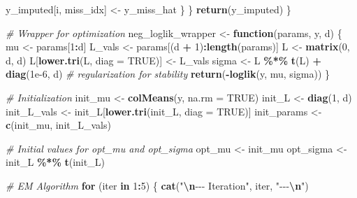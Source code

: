 \documentclass[
]{article}
\newenvironment{Shaded}{\begin{snugshade}}{\end{snugshade}}
\newcommand{\AttributeTok}[1]{\textcolor[rgb]{0.13,0.29,0.53}{#1}}
\newcommand{\CommentTok}[1]{\textcolor[rgb]{0.56,0.35,0.01}{\textit{#1}}}
\newcommand{\ConstantTok}[1]{\textcolor[rgb]{0.56,0.35,0.01}{#1}}
\newcommand{\ControlFlowTok}[1]{\textcolor[rgb]{0.13,0.29,0.53}{\textbf{#1}}}
\newcommand{\DecValTok}[1]{\textcolor[rgb]{0.00,0.00,0.81}{#1}}
\newcommand{\FloatTok}[1]{\textcolor[rgb]{0.00,0.00,0.81}{#1}}
\newcommand{\FunctionTok}[1]{\textcolor[rgb]{0.13,0.29,0.53}{\textbf{#1}}}
\newcommand{\NormalTok}[1]{#1}
\newcommand{\OtherTok}[1]{\textcolor[rgb]{0.56,0.35,0.01}{#1}}
\newcommand{\SpecialCharTok}[1]{\textcolor[rgb]{0.81,0.36,0.00}{\textbf{#1}}}
\newcommand{\StringTok}[1]{\textcolor[rgb]{0.31,0.60,0.02}{#1}}
\begin{document}
\begin{Shaded}
\begin{Highlighting}[]
\NormalTok{      y\_imputed[i, miss\_idx] }\OtherTok{\textless{}{-}}\NormalTok{ y\_miss\_hat}
\NormalTok{    \}}
\NormalTok{  \}}
  \FunctionTok{return}\NormalTok{(y\_imputed)}
\NormalTok{\}}

\CommentTok{\# Wrapper for optimization}
\NormalTok{neg\_loglik\_wrapper }\OtherTok{\textless{}{-}} \ControlFlowTok{function}\NormalTok{(params, y, d) \{}
\NormalTok{  mu }\OtherTok{\textless{}{-}}\NormalTok{ params[}\DecValTok{1}\SpecialCharTok{:}\NormalTok{d]}
\NormalTok{  L\_vals }\OtherTok{\textless{}{-}}\NormalTok{ params[(d }\SpecialCharTok{+} \DecValTok{1}\NormalTok{)}\SpecialCharTok{:}\FunctionTok{length}\NormalTok{(params)]}
\NormalTok{  L }\OtherTok{\textless{}{-}} \FunctionTok{matrix}\NormalTok{(}\DecValTok{0}\NormalTok{, d, d)}
\NormalTok{  L[}\FunctionTok{lower.tri}\NormalTok{(L, }\AttributeTok{diag =} \ConstantTok{TRUE}\NormalTok{)] }\OtherTok{\textless{}{-}}\NormalTok{ L\_vals}
\NormalTok{  sigma }\OtherTok{\textless{}{-}}\NormalTok{ L }\SpecialCharTok{\%*\%} \FunctionTok{t}\NormalTok{(L) }\SpecialCharTok{+} \FunctionTok{diag}\NormalTok{(}\FloatTok{1e{-}6}\NormalTok{, d)  }\CommentTok{\# regularization for stability}
  \FunctionTok{return}\NormalTok{(}\SpecialCharTok{{-}}\FunctionTok{loglik}\NormalTok{(y, mu, sigma))}
\NormalTok{\}}

\CommentTok{\# Initialization}
\NormalTok{init\_mu }\OtherTok{\textless{}{-}} \FunctionTok{colMeans}\NormalTok{(y, }\AttributeTok{na.rm =} \ConstantTok{TRUE}\NormalTok{)}
\NormalTok{init\_L }\OtherTok{\textless{}{-}} \FunctionTok{diag}\NormalTok{(}\DecValTok{1}\NormalTok{, d)}
\NormalTok{init\_L\_vals }\OtherTok{\textless{}{-}}\NormalTok{ init\_L[}\FunctionTok{lower.tri}\NormalTok{(init\_L, }\AttributeTok{diag =} \ConstantTok{TRUE}\NormalTok{)]}
\NormalTok{init\_params }\OtherTok{\textless{}{-}} \FunctionTok{c}\NormalTok{(init\_mu, init\_L\_vals)}

\CommentTok{\# Initial values for opt\_mu and opt\_sigma}
\NormalTok{opt\_mu }\OtherTok{\textless{}{-}}\NormalTok{ init\_mu}
\NormalTok{opt\_sigma }\OtherTok{\textless{}{-}}\NormalTok{ init\_L }\SpecialCharTok{\%*\%} \FunctionTok{t}\NormalTok{(init\_L)}

\CommentTok{\# EM Algorithm}
\ControlFlowTok{for}\NormalTok{ (iter }\ControlFlowTok{in} \DecValTok{1}\SpecialCharTok{:}\DecValTok{5}\NormalTok{) \{}
  \FunctionTok{cat}\NormalTok{(}\StringTok{"}\SpecialCharTok{\textbackslash{}n}\StringTok{{-}{-}{-} Iteration"}\NormalTok{, iter, }\StringTok{"{-}{-}{-}}\SpecialCharTok{\textbackslash{}n}\StringTok{"}\NormalTok{)}


\end{Highlighting}
\end{Shaded}
\end{document}
